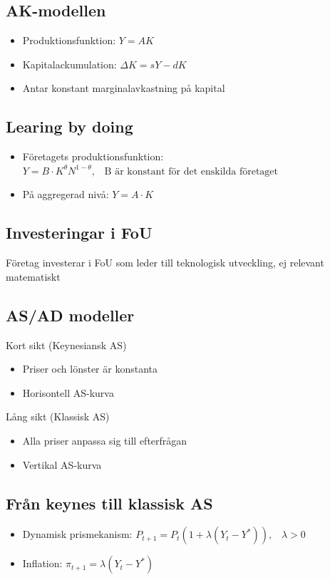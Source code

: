 \documentclass[12pt,a4paper]{article}
\begin{document}
\subsection*{AK-modellen}
\begin{itemize}
    \item Produktionsfunktion: $Y = AK$
    \item Kapitalackumulation: $\Delta K = sY - dK$
    \item Antar konstant marginalavkastning på kapital
\end{itemize}

\subsection*{Learing by doing}
\begin{itemize}
    \item Företagets produktionsfunktion: $Y = B \cdot K^{\theta} N^{1-\theta}, \hspace{10pt} \text{B är konstant för det enskilda företaget}$
    \item På aggregerad nivå: $Y = A \cdot K$
\end{itemize}

\subsection*{Investeringar i FoU}
Företag investerar i FoU som leder till teknologisk utveckling, ej relevant matematiskt

\subsection*{AS/AD modeller}
\noindent Kort sikt (Keynesiansk AS)
\begin{itemize}
    \item Priser och lönster är konstanta
    \item Horisontell AS-kurva
\end{itemize}

\noindent Lång sikt (Klassisk AS)
\begin{itemize}
    \item Alla priser anpassa sig till efterfrågan
    \item Vertikal AS-kurva
\end{itemize}

\subsection{Från keynes till klassisk AS}
\begin{itemize}
    \item Dynamisk prismekanism: $P_{t+1} = P_t(1 + \lambda (Y_t - Y^*)), \hspace{10pt} \lambda > 0$
    \item Inflation: $\pi_{t+1} = \lambda (Y_t - Y^*)$
\end{itemize}
\end{document}

